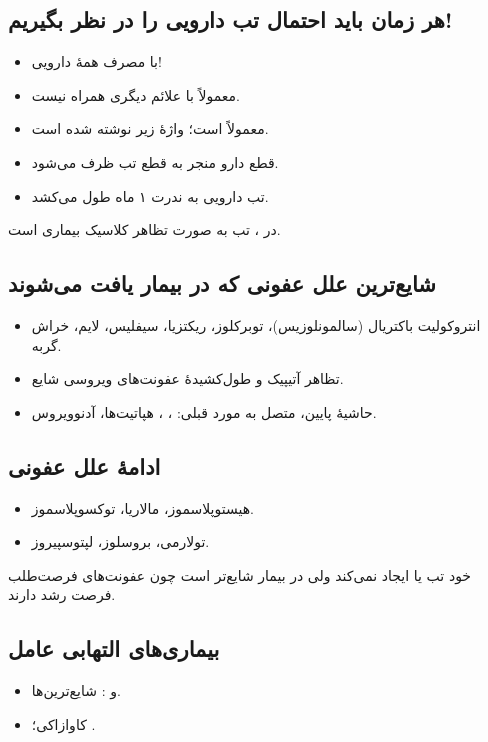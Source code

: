 \documentclass[12pt,a4paper]{article}
\begin{document}
\subsection*{هر زمان باید احتمال تب دارویی را در نظر بگیریم!}
\begin{itemize}
\item با مصرف همهٔ دارویی! 
\item معمولاً با علائم دیگری همراه نیست.
\item معمولاً  است؛ واژهٔ  زیر  نوشته شده است.
\item قطع دارو منجر به قطع تب ظرف  می‌شود.
\item تب دارویی به ندرت ۱ ماه طول می‌کشد.
\end{itemize}

در ، تب به صورت  تظاهر کلاسیک بیماری است.

\subsection*{شایع‌ترین علل عفونی که در بیمار  یافت می‌شوند}
\begin{itemize}
\item انتروکولیت باکتریال (سالمونلوزیس)، توبرکلوز، ریکتزیا، سیفلیس، لایم، خراش گربه.
\item تظاهر آتیپیک و طول‌کشیدهٔ عفونت‌های ویروسی شایع.
\item حاشیهٔ پایین، متصل به مورد قبلی: ، ، هپاتیت‌ها، آدنوویروس.
\end{itemize}

\subsection*{ادامهٔ علل عفونی}
\begin{itemize}
\item هیستوپلاسموز، مالاریا، توکسوپلاسموز.
\item تولارمی، بروسلوز، لپتوسپیروز.
\end{itemize}

خود  تب یا  ایجاد نمی‌کند ولی  در بیمار  شایع‌تر است چون عفونت‌های فرصت‌طلب فرصت رشد دارند.

\subsection*{بیماری‌های التهابی عامل }
\begin{itemize}
\item {} و : شایع‌ترین‌ها.
\item کاوازاکی؛ .
\end{itemize}
\end{document}
